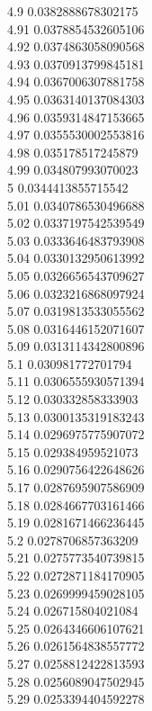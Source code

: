 {4.9	0.0382888678302175\\
4.91	0.0378854532605106\\
4.92	0.0374863058090568\\
4.93	0.0370913799845181\\
4.94	0.0367006307881758\\
4.95	0.0363140137084303\\
4.96	0.0359314847153665\\
4.97	0.0355530002553816\\
4.98	0.035178517245879\\
4.99	0.034807993070023\\
5	0.0344413855715542\\
5.01	0.0340786530496688\\
5.02	0.0337197542539549\\
5.03	0.0333646483793908\\
5.04	0.0330132950613992\\
5.05	0.0326656543709627\\
5.06	0.0323216868097924\\
5.07	0.0319813533055562\\
5.08	0.0316446152071607\\
5.09	0.0313114342800896\\
5.1	0.030981772701794\\
5.11	0.0306555930571394\\
5.12	0.030332858333903\\
5.13	0.0300135319183243\\
5.14	0.0296975775907072\\
5.15	0.029384959521073\\
5.16	0.0290756422648626\\
5.17	0.0287695907586909\\
5.18	0.0284667703161466\\
5.19	0.0281671466236445\\
5.2	0.0278706857363209\\
5.21	0.0275773540739815\\
5.22	0.0272871184170905\\
5.23	0.0269999459028105\\
5.24	0.026715804021084\\
5.25	0.0264346606107621\\
5.26	0.0261564838557772\\
5.27	0.0258812422813593\\
5.28	0.0256089047502945\\
5.29	0.0253394404592278\\
}
